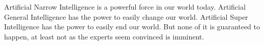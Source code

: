 \documentclass[12pt]{article} %
\begin{document}
Artificial Narrow Intelligence is a powerful force in our world today. Artificial General Intelligence has the power to easily change our world. Artificial Super Intelligence has the power to easily end our world. But none of it is guaranteed to happen, at least not as the experts seem convinced is imminent.


\newpage %




\end{document}
